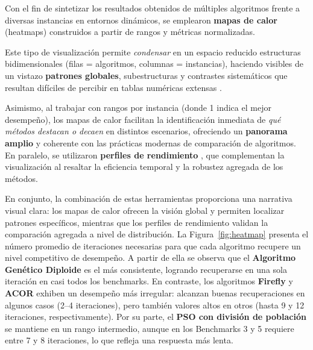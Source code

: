 \documentclass[10pt]{article}
\begin{document}
Con el fin de sintetizar los resultados obtenidos de múltiples algoritmos frente a diversas instancias en entornos dinámicos, se emplearon \textbf{mapas de calor} (heatmaps) construidos a partir de rangos y métricas normalizadas. 

Este tipo de visualización permite \textit{condensar} en un espacio reducido estructuras bidimensionales (filas = algoritmos, columnas = instancias), haciendo visibles de un vistazo \textbf{patrones globales}, subestructuras y contrastes sistemáticos que resultan difíciles de percibir en tablas numéricas extensas \citep{wilkinson2009clusterheatmap}. 

Asimismo, al trabajar con rangos por instancia (donde 1 indica el mejor desempeño), los mapas de calor facilitan la identificación inmediata de \textit{qué métodos destacan o decaen} en distintos escenarios, ofreciendo un \textbf{panorama amplio} y coherente con las prácticas modernas de comparación de algoritmos. En paralelo, se utilizaron \textbf{perfiles de rendimiento} \citep{dolan2002performanceprofiles}, que complementan la visualización al resaltar la eficiencia temporal y la robustez agregada de los métodos. 

En conjunto, la combinación de estas herramientas proporciona una narrativa visual clara: los mapas de calor ofrecen la visión global y permiten localizar patrones específicos, mientras que los perfiles de rendimiento validan la comparación agregada a nivel de distribución. La Figura~\ref{fig:heatmap} presenta el número promedio de iteraciones necesarias para que cada algoritmo recupere un nivel competitivo de desempeño. A partir de ella se observa que el \textbf{Algoritmo Genético Diploide} es el más consistente, logrando recuperarse en una sola iteración en casi todos los benchmarks. En contraste, los algoritmos \textbf{Firefly} y \textbf{ACOR} exhiben un desempeño más irregular: alcanzan buenas recuperaciones en algunos casos (2--4 iteraciones), pero también valores altos en otros (hasta 9 y 12 iteraciones, respectivamente). Por su parte, el \textbf{PSO con división de población} se mantiene en un rango intermedio, aunque en los Benchmarks 3 y 5 requiere entre 7 y 8 iteraciones, lo que refleja una respuesta más lenta.
\end{document}
